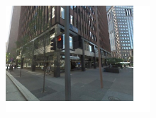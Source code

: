 \begin{minipage}{1.0\linewidth}
\end{minipage}
\begin{minipage}{0.34\linewidth}
    \centering
    \vspace{5mm}
    \hspace{5mm}\includegraphics[height=40mm]{imgs/ex1/query.jpg}
\end{minipage}
